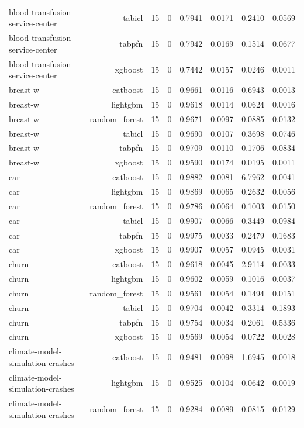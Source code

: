 \begin{table}[htbp]
\begin{tabular}{lrrrrrrr}
blood-transfusion-service-center & tabicl & 15 & 0 & 0.7941 & 0.0171 & 0.2410 & 0.0569 \\
blood-transfusion-service-center & tabpfn & 15 & 0 & 0.7942 & 0.0169 & 0.1514 & 0.0677 \\
blood-transfusion-service-center & xgboost & 15 & 0 & 0.7442 & 0.0157 & 0.0246 & 0.0011 \\
breast-w & catboost & 15 & 0 & 0.9661 & 0.0116 & 0.6943 & 0.0013 \\
breast-w & lightgbm & 15 & 0 & 0.9618 & 0.0114 & 0.0624 & 0.0016 \\
breast-w & random\_forest & 15 & 0 & 0.9671 & 0.0097 & 0.0885 & 0.0132 \\
breast-w & tabicl & 15 & 0 & 0.9690 & 0.0107 & 0.3698 & 0.0746 \\
breast-w & tabpfn & 15 & 0 & 0.9709 & 0.0110 & 0.1706 & 0.0834 \\
breast-w & xgboost & 15 & 0 & 0.9590 & 0.0174 & 0.0195 & 0.0011 \\
car & catboost & 15 & 0 & 0.9882 & 0.0081 & 6.7962 & 0.0041 \\
car & lightgbm & 15 & 0 & 0.9869 & 0.0065 & 0.2632 & 0.0056 \\
car & random\_forest & 15 & 0 & 0.9786 & 0.0064 & 0.1003 & 0.0150 \\
car & tabicl & 15 & 0 & 0.9907 & 0.0066 & 0.3449 & 0.0984 \\
car & tabpfn & 15 & 0 & 0.9975 & 0.0033 & 0.2479 & 0.1683 \\
car & xgboost & 15 & 0 & 0.9907 & 0.0057 & 0.0945 & 0.0031 \\
churn & catboost & 15 & 0 & 0.9618 & 0.0045 & 2.9114 & 0.0033 \\
churn & lightgbm & 15 & 0 & 0.9602 & 0.0059 & 0.1016 & 0.0037 \\
churn & random\_forest & 15 & 0 & 0.9561 & 0.0054 & 0.1494 & 0.0151 \\
churn & tabicl & 15 & 0 & 0.9704 & 0.0042 & 0.3314 & 0.1893 \\
churn & tabpfn & 15 & 0 & 0.9754 & 0.0034 & 0.2061 & 0.5336 \\
churn & xgboost & 15 & 0 & 0.9569 & 0.0054 & 0.0722 & 0.0028 \\
climate-model-simulation-crashes & catboost & 15 & 0 & 0.9481 & 0.0098 & 1.6945 & 0.0018 \\
climate-model-simulation-crashes & lightgbm & 15 & 0 & 0.9525 & 0.0104 & 0.0642 & 0.0019 \\
climate-model-simulation-crashes & random\_forest & 15 & 0 & 0.9284 & 0.0089 & 0.0815 & 0.0129 \\

\end{tabular}
\end{table}
